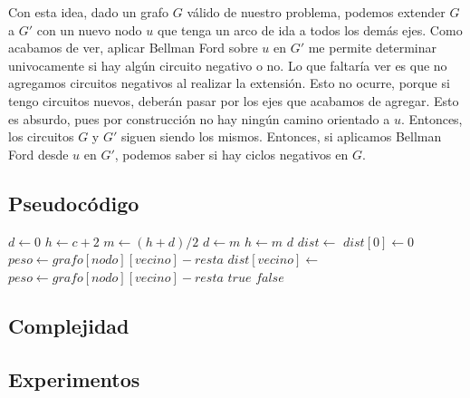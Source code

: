 Con esta idea, dado un grafo  $G$ válido de nuestro problema, podemos extender $G$ a $G'$ con un nuevo nodo $u$ que tenga un arco de ida a todos los demás ejes. Como acabamos de ver, aplicar Bellman Ford sobre $u$ en $G'$ me permite determinar univocamente si hay algún circuito negativo o no. Lo que faltaría ver es que no agregamos circuitos negativos al realizar la extensión. Esto no ocurre, porque si tengo circuitos nuevos, deberán pasar por los ejes que acabamos de agregar. Esto es absurdo, pues por construcción no hay ningún camino orientado a $u$. Entonces, los circuitos $G$ y $G'$ siguen siendo los mismos. Entonces, si aplicamos Bellman Ford desde $u$ en $G'$, podemos saber si hay ciclos negativos en $G$. \\



\newpage
\subsection{Pseudocódigo}

\begin{algorithm}
\label{resolver}         %
\begin{algorithmic}
    \State $d \gets 0$
	\State $h \gets c + 2$
		\State $m \gets (h + d)/2$
			\State $d \gets m$
		\Else
			\State $h \gets m$
		\EndIf
	\EndWhile
	\Return $d$
\EndFunction
{}
	\State $dist \gets$ 
	\State $dist[0] \gets 0$
				\State $peso \gets grafo[nodo][vecino] - resta$
				\State $dist[vecino] \gets$ 
			\EndFor
		\EndFor
	\EndFor
	\Return {}
\EndFunction
{}
			\State $peso \gets grafo[nodo][vecino] - resta$
				\Return $true$
			\EndIf
		\EndFor
	\EndFor
	\Return $false$
\EndFunction
\end{algorithmic}
\end{algorithm}
\newpage
\subsection{Complejidad}

\subsection{Experimentos}